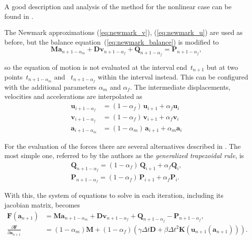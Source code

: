 A good description and analysis of the method for the nonlinear case can be found in \cite{bib:erlicher2002}.

The Newmark approximations (\ref{eq:newmark_v}), (\ref{eq:newmark_u}) are used as before, but the balance equation~(\ref{eq:newmark_balance}) is modified to
%
\begin{equation}
\boldsymbol{M}\boldsymbol{a}_{n+1-\alpha_m} + \boldsymbol{D}\mathbf{v}_{n+1-\alpha_f} + \boldsymbol{Q}_{n+1-\alpha_f} = \boldsymbol{P}_{n+1-\alpha_f},
\end{equation}

so the equation of motion is not evaluated at the interval end~$t_{n+1}$ but at two points~$t_{n+1-\alpha_m}$ and~ $t_{n+1-\alpha_f}$ within the interval instead.
This can be configured with the additional parameters $\alpha_{m}$ and $\alpha_{f}$.
The intermediate displacements, velocities and accelerations are interpolated as
%
\begin{align}
\boldsymbol{u}_{i+1-\alpha_f} &= (1 - \alpha_f)\,\boldsymbol{u}_{i+1} + \alpha_f\boldsymbol{u}_{i} \\
\mathbf{v}_{i+1-\alpha_f} &= (1 - \alpha_f)\,\mathbf{v}_{i+1} + \alpha_f\mathbf{v}_{i} \\
\boldsymbol{a}_{i+1-\alpha_m} &= (1 - \alpha_m)\,\boldsymbol{a}_{i+1} + \alpha_m\boldsymbol{a}_{i}
\end{align}

For the evaluation of the forces there are several alternatives described in \cite{bib:erlicher2002}.
The most simple one, referred to by the authors as the \textit{generalized trapezoidal rule}, is
%
\begin{align}
\boldsymbol{Q}_{n+1-\alpha_f} =  (1 - \alpha_f)\,\boldsymbol{Q}_{i+1} + \alpha_f\boldsymbol{Q}_{i}, \\
\boldsymbol{P}_{n+1-\alpha_f} =  (1 - \alpha_f)\,\boldsymbol{P}_{i+1} + \alpha_f\boldsymbol{P}_{i}.
\end{align}

With this, the system of equations to solve in each iteration, including its jacobian matrix, becomes
%
\begin{align}
\boldsymbol{F}(\boldsymbol{a}_{n+1}) &= \boldsymbol{M}\boldsymbol{a}_{n+1-\alpha_m} + \boldsymbol{D}\mathbf{v}_{n+1-\alpha_f} + \boldsymbol{Q}_{n+1-\alpha_f} - \boldsymbol{P}_{n+1-\alpha_f}, \\
\frac{\partial \boldsymbol{F}}{\partial \boldsymbol{a}_{n+1}} &= (1 - \alpha_m)\boldsymbol{M} + (1 - \alpha_f)\left( \gamma \Delta t \boldsymbol{D} + \beta \Delta t^2 \boldsymbol{K}(\boldsymbol{u}_{n+1}(\boldsymbol{a}_{n+1})) \right).
\end{align}

